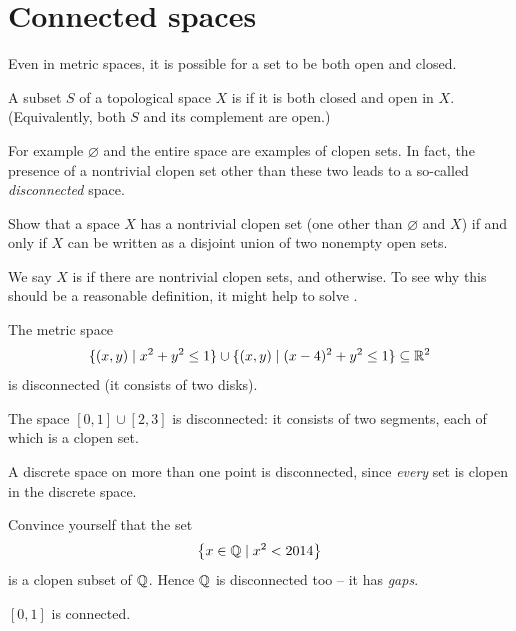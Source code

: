 \section{Connected spaces}

Even in metric spaces, it is possible for a set to be both open and closed.
\begin{definition}
	A subset $S$ of a topological space $X$
	is  if it is both closed and open in $X$.
	(Equivalently, both $S$ and its complement are open.)
\end{definition}
For example $\varnothing$ and the entire space are examples of clopen sets.
In fact, the presence of a nontrivial clopen set other
than these two leads to a so-called \emph{disconnected} space.

\begin{ques}
	Show that a space $X$ has a nontrivial clopen set (one other than $\varnothing$ and $X$)
	if and only if $X$ can be written as a disjoint union of two nonempty open sets.
\end{ques}

We say $X$ is  if there are nontrivial clopen sets,
and  otherwise.
To see why this should be a reasonable definition,
it might help to solve .

\begin{example}
	\listhack
	\begin{enumerate}[(a)]
		\ii The metric space
		\[ \{ (x,y) \mid x^2+y^2\le 1 \}
			\cup \{ (x,y) \mid (x-4)^2+y^2\le1\} \subseteq \mathbb R^2 \]
		is disconnected (it consists of two disks).

		\ii The space $[0,1] \cup [2,3]$ is disconnected:
		it consists of two segments,
		each of which is a clopen set.

		\ii A discrete space on more than one point is disconnected,
		since \emph{every} set is clopen in the discrete space.

		\ii Convince yourself that the set
		\[ \left\{ x \in \mathbb Q \mid x^2 < 2014 \right\} \]
		is a clopen subset of $\mathbb Q$.
		Hence $\mathbb Q$ is disconnected too -- it has \emph{gaps}.

		\ii $[0,1]$ is connected.
	\end{enumerate}
\end{example}


